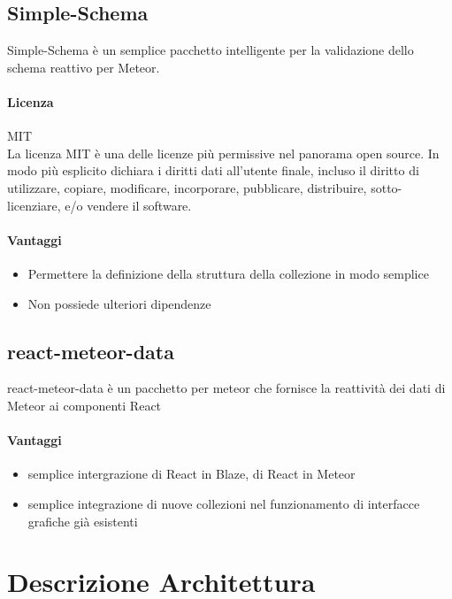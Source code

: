\subsection{Simple-Schema}
Simple-Schema è un semplice pacchetto intelligente per la validazione dello schema reattivo per Meteor.

\paragraph{Licenza} MIT \\
La licenza MIT è una delle licenze più permissive nel panorama open
source. In modo più esplicito dichiara i diritti dati all'utente
finale, incluso il diritto di utilizzare, copiare, modificare,
incorporare, pubblicare, distribuire, sotto-licenziare, e/o vendere il
software. 
\\



\paragraph{Vantaggi}
\begin{itemize}
\item Permettere la definizione della struttura della collezione in modo semplice
\item Non possiede ulteriori dipendenze 
\end{itemize}


\subsection{react-meteor-data}
react-meteor-data è un pacchetto per meteor che fornisce la reattività
dei dati di Meteor ai componenti React

\paragraph{Vantaggi}
\begin{itemize}
\item semplice intergrazione di React in Blaze, di React in Meteor
\item semplice integrazione di nuove collezioni nel funzionamento di
  interfacce grafiche già esistenti
\end{itemize}


\section{Descrizione Architettura}
